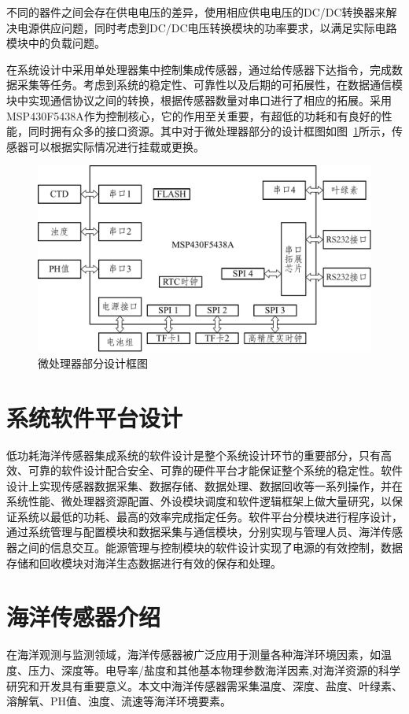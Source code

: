 不同的器件之间会存在供电电压的差异，使用相应供电电压的DC/DC转换器来解决电源供应问题，同时考虑到DC/DC电压转换模块的功率要求，以满足实际电路模块中的负载问题。

在系统设计中采用单处理器集中控制集成传感器，通过给传感器下达指令，完成数据采集等任务。考虑到系统的稳定性、可靠性以及后期的可拓展性，在数据通信模块中实现通信协议之间的转换，根据传感器数量对串口进行了相应的拓展。采用MSP430F5438A作为控制核心，它的作用至关重要，有超低的功耗和有良好的性能，同时拥有众多的接口资源。其中对于微处理器部分的设计框图如图~\ref{fig:微处理器}所示，传感器可以根据实际情况进行挂载或更换。
\begin{figure}[ht]
    \centering
	\includegraphics[width=1\textwidth]{fig/微处理器部分设计框图.pdf}
	\caption{微处理器部分设计框图}
	\label{fig:微处理器}
\end{figure}

\section{系统软件平台设计}
低功耗海洋传感器集成系统的软件设计是整个系统设计环节的重要部分，只有高效、可靠的软件设计配合安全、可靠的硬件平台才能保证整个系统的稳定性。软件设计上实现传感器数据采集、数据存储、数据处理、数据回收等一系列操作，并在系统性能、微处理器资源配置、外设模块调度和软件逻辑框架上做大量研究，以保证系统以最低的功耗、最高的效率完成指定任务。软件平台分模块进行程序设计，通过系统管理与配置模块和数据采集与通信模块，分别实现与管理人员、海洋传感器之间的信息交互。能源管理与控制模块的软件设计实现了电源的有效控制，数据存储和回收模块对海洋生态数据进行有效的保存和处理。
\section{海洋传感器介绍}
在海洋观测与监测领域，海洋传感器被广泛应用于测量各种海洋环境因素，如温度、压力、深度等。电导率/盐度和其他基本物理参数海洋因素,对海洋资源的科学研究和开发具有重要意义。本文中海洋传感器需采集温度、深度、盐度、叶绿素、溶解氧、PH值、浊度、流速等海洋环境要素。


